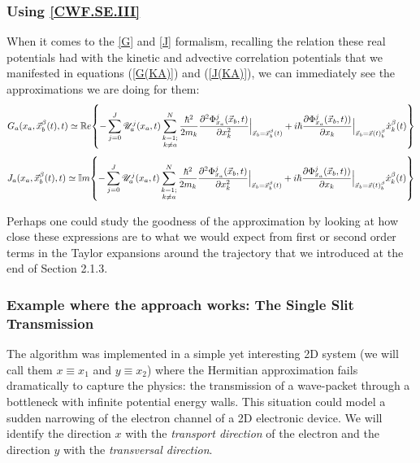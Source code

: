 \documentclass[11pt, a4paper]{article} %
\newcommand{\R}{\mathbb{R}} %
\newcommand{\U}{\mathscr{U}}
\begin{document}

\subsubsection{Using \ref{CWF.SE.III}}
When it comes to the \ref{G} and \ref{J} formalism, recalling the relation these real potentials had with the kinetic and advective correlation potentials that we manifested in equations (\ref{G(KA)}) and (\ref{J(KA)}), we can immediately see the approximations we are doing for them:
$$
G_a(x_a,\vec{x}_b^\beta(t),t)\simeq \R e \qty{ - \sum_{j=0}^J  \U^j_a(x_a,t) \sum_{\substack{k=1; \\ k\neq a}}^{N}  \frac{\hbar^2}{2m_k} \pdv[2]{ \Phi_{x_a}^j(\vec{x}_b,t)}{x_k}\Big\rvert_{\vec{x}_b=\vec{x}_b^\beta(t)} +  i \hbar \pdv{ \Phi_{x_a}^j(\vec{x}_b,t))}{x_k}\Big\rvert_{\vec{x}_b=\vec{x}(t)_b^\beta} \dot{x}_k^\beta(t)}
$$
$$
J_a(x_a,\vec{x}_b^\beta(t),t)\simeq \mathbb{I} m \qty{ - \sum_{j=0}^J  \U^j_a(x_a,t) \sum_{\substack{k=1; \\ k\neq a}}^{N}  \frac{\hbar^2}{2m_k} \pdv[2]{ \Phi_{x_a}^j(\vec{x}_b,t)}{x_k}\Big\rvert_{\vec{x}_b=\vec{x}_b^\beta(t)} +  i \hbar \pdv{ \Phi_{x_a}^j(\vec{x}_b,t))}{x_k}\Big\rvert_{\vec{x}_b=\vec{x}(t)_b^\beta} \dot{x}_k^\beta(t)}
$$

Perhaps one could study the goodness of the approximation by looking at how close these expressions are to what we would expect from first or second order terms in the Taylor expansions around the trajectory that we introduced at the end of Section 2.1.3.


\subsubsection{Example where the approach works: The Single Slit Transmission}
The algorithm was implemented in a simple yet interesting 2D system (we will call them $x\equiv x_1$ and $y\equiv x_2$) where the Hermitian approximation fails dramatically to capture the physics: the transmission of a wave-packet through a bottleneck with infinite potential energy walls. This situation could model a sudden narrowing of the electron channel of a 2D electronic device. We will identify the direction $x$ with the {\em transport direction} of the electron and the direction $y$ with the {\em transversal direction}.

\end{document}
